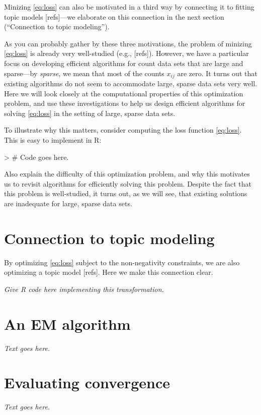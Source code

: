 \documentclass[final]{siamart171218}
\begin{document}
Minizing \eqref{eq:loss} can also be motivated in a third way by
connecting it to fitting topic models [refs]---we elaborate on this
connection in the next section (``Connection to topic modeling'').

As you can probably gather by these three motivations, the problem of
minizing \eqref{eq:loss} is already very well-studied (e.g.,
[refs]). However, we have a particular focus on developing efficient
algorithms for count data sets that are large and sparse---by {\em
  sparse}, we mean that most of the counts $x_{ij}$ are zero. It
turns out that existing algorithms do not seem to accommodate large,
sparse data sets very well. Here we will look closely at the
computational properties of this optimization problem, and use these
investigations to help us design efficient algorithms for solving
\eqref{eq:loss} in the setting of large, sparse data sets.

To illustrate why this matters, consider computing the loss function
\eqref{eq:loss}. This is easy to implement in R:
\begin{Schunk}
\begin{Sinput}
> # Code goes here.
\end{Sinput}
\end{Schunk}

Also explain the difficulty of this optimization problem, and why this
motivates us to revisit algorithms for efficiently solving this
problem.  Despite the fact that this problem is well-studied, it turns
out, as we will see, that existing solutions are inadequate for large,
sparse data sets.



\section{Connection to topic modeling}
By optimizing \eqref{eq:loss} subject to the non-negativity
constraints, we are also optimizing a topic model [refs]. Here we make
this connection clear.

{\em Give R code here implementing this transformation.}

\section{An EM algorithm}
{\em Text goes here.}

\section{Evaluating convergence}
{\em Text goes here.}
\end{document}
